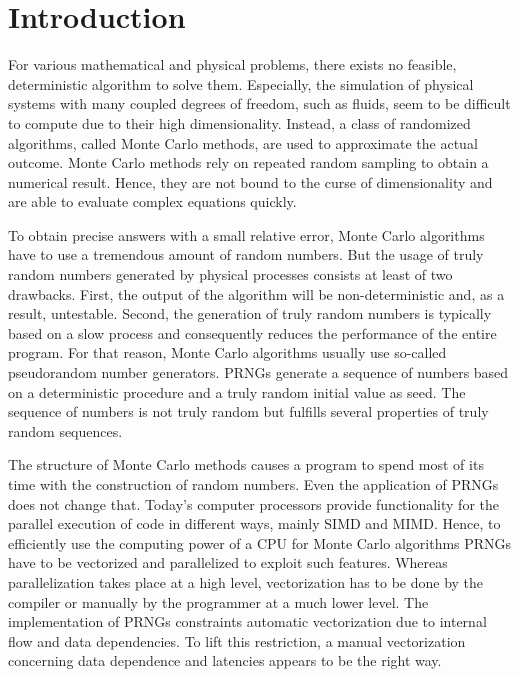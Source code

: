 \documentclass{stdlocal}
\begin{document}
\section{Introduction} %
\label{sec:introduction}

For various mathematical and physical problems, there exists no feasible, deterministic algorithm to solve them.
Especially, the simulation of physical systems with many coupled degrees of freedom, such as fluids, seem to be difficult to compute due to their high dimensionality.
Instead, a class of randomized algorithms, called Monte Carlo methods, are used to approximate the actual outcome.
Monte Carlo methods rely on repeated random sampling to obtain a numerical result.
Hence, they are not bound to the curse of dimensionality and are able to evaluate complex equations quickly.

To obtain precise answers with a small relative error, Monte Carlo algorithms have to use a tremendous amount of random numbers.
But the usage of truly random numbers generated by physical processes consists at least of two drawbacks.
First, the output of the algorithm will be non-deterministic and, as a result, untestable.
Second, the generation of truly random numbers is typically based on a slow process and consequently reduces the performance of the entire program.
For that reason, Monte Carlo algorithms usually use so-called pseudorandom number generators.
PRNGs generate a sequence of numbers based on a deterministic procedure and a truly random initial value as seed.
The sequence of numbers is not truly random but fulfills several properties of truly random sequences.

The structure of Monte Carlo methods causes a program to spend most of its time with the construction of random numbers.
Even the application of PRNGs does not change that.
Today's computer processors provide functionality for the parallel execution of code in different ways, mainly SIMD and MIMD.
Hence, to efficiently use the computing power of a CPU for Monte Carlo algorithms PRNGs have to be vectorized and parallelized to exploit such features.
Whereas parallelization takes place at a high level, vectorization has to be done by the compiler or manually by the programmer at a much lower level.
The implementation of PRNGs constraints automatic vectorization due to internal flow and data dependencies.
To lift this restriction, a manual vectorization concerning data dependence and latencies appears to be the right way.
\end{document}
